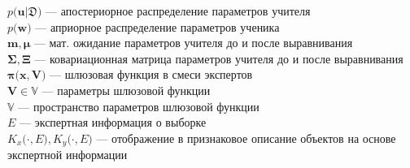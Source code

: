 $p\bigr(\mathbf{u}|\mathfrak{D}\bigr)$ --- апостериорное распределение параметров учителя\\
$p\bigr(\mathbf{w}\bigr)$ --- априорное распределение параметров ученика\\
$\mathbf{m}, \bm{\mu}$ --- мат. ожидание параметров учителя до и после выравнивания\\
$\bm{\Sigma}, \bm{\Xi}$ --- ковариационная матрица параметров учителя до и после выравнивания\\
$\bm{\pi}\bigr(\mathbf{x}, \mathbf{V}\bigr)$ --- шлюзовая функция в смеси экспертов\\
$\mathbf{V} \in \mathbb{V}$ --- параметры шлюзовой функции\\
$\mathbb{V}$ --- пространство параметров шлюзовой функции\\
$E$ --- экспертная информация о выборке\\
$K_{x}\bigr(\cdot, E\bigr), K_{y}\bigr(\cdot, E\bigr)$ --- отображение в признаковое описание объектов на основе экспертной информации\\